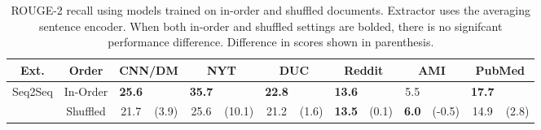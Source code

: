 \begin{table*}[t]
\center

\begin{tabular}{cccm{.5cm}cm{.5cm}cm{.5cm}cm{.75cm}cm{.75cm}cm{.5cm}}
    \toprule
    \textbf{Ext.} &\textbf{Order}  & \multicolumn{2}{c}{\textbf{CNN/DM}} & \multicolumn{2}{c}{\textbf{NYT}} & \multicolumn{2}{c}{\textbf{DUC}} & \multicolumn{2}{c}{\textbf{Reddit}} & \multicolumn{2}{c}{\textbf{AMI}} & \multicolumn{2}{c}{\textbf{PubMed}}\\
    \midrule
    \multirow{2}{*}{Seq2Seq} & In-Order & \textbf{25.6} & & \textbf{35.7} && \textbf{22.8}& & \textbf{13.6} && 5.5 && \textbf{17.7} &\\
                             & Shuffled & 21.7&\scriptsize{(3.9)} & 25.6 & \scriptsize{(10.1)} & 21.2 & \scriptsize{(1.6)} &\textbf{13.5} &\scriptsize{(0.1)} &\textbf{6.0} & \scriptsize{(-0.5)}&14.9 &\scriptsize{(2.8)}\\
    \bottomrule
\end{tabular}

\caption{ROUGE-2 recall using models trained on in-order and shuffled
documents. Extractor uses the averaging sentence encoder. 
When both in-order and shuffled settings are bolded,
there is no signifcant performance difference. Difference in scores shown in parenthesis.
}
\label{tab:shuffle}
\end{table*}
